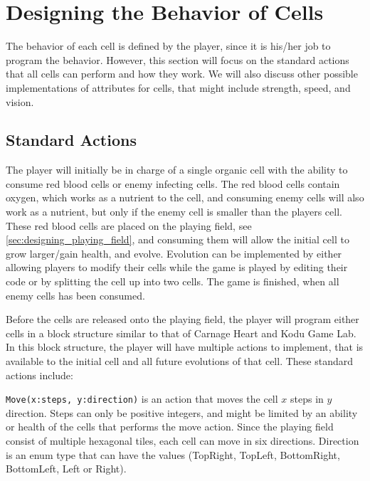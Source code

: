 \section{Designing the Behavior of Cells}
\label{sec:designingBehaviorCells}
The behavior of each cell is defined by the player, since it is his/her job to program the behavior. However, this section will focus on the standard actions that all cells can perform and how they work. We will also discuss other possible implementations of attributes for cells, that might include strength, speed, and vision.

\subsection{Standard Actions}

The player will initially be in charge of a single organic cell with the ability to consume red blood cells or enemy infecting cells.
The red blood cells contain oxygen, which works as a nutrient to the cell, and consuming enemy cells will also work as a nutrient, but only if the enemy cell is smaller than the players cell.
These red blood cells are placed on the playing field, see \autoref{sec:designing_playing_field}, and consuming them will allow the initial cell to grow larger/gain health, and evolve.
Evolution can be implemented by either allowing players to modify their cells while the game is played by editing their code or by splitting the cell up into two cells.
The game is finished, when all enemy cells has been consumed.\newline

Before the cells are released onto the playing field, the player will program either cells in a block structure similar to that of Carnage Heart and Kodu Game Lab.
In this block structure, the player will have multiple actions to implement, that is available to the initial cell and all future evolutions of that cell.
These standard actions include:\newline

\verb|Move(x:steps, y:direction)| is an action that moves the cell $x$ steps in $y$ direction.
Steps can only be positive integers, and might be limited by an ability or health of the cells that performs the move action.
Since the playing field consist of multiple hexagonal tiles, each cell can move in six directions.
Direction is an enum type that can have the values (TopRight, TopLeft, BottomRight, BottomLeft, Left or Right).\newline

